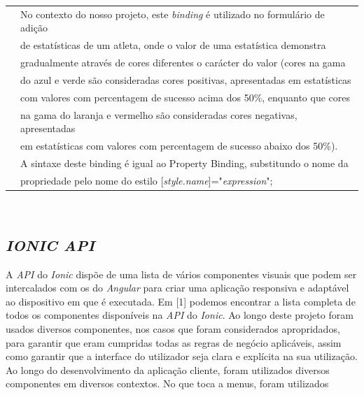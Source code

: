 \begin{tabular}{ll}
	& No contexto do nosso projeto, este \textit{binding} é utilizado no formulário de adição\\
	&de estatísticas de um atleta, onde o valor de uma estatística demonstra \\
	&gradualmente através de cores diferentes o carácter do valor (cores na gama \\
	&do azul e verde são consideradas cores positivas, apresentadas em estatísticas \\
	&com valores com percentagem de sucesso acima dos 50\%, enquanto que cores \\
	&na gama do laranja e vermelho são consideradas cores negativas, apresentadas\\
	& em estatísticas com valores com percentagem de sucesso abaixo dos 50\%). \\
	&A sintaxe deste binding é igual ao Property Binding, substitundo o nome da \\
	&propriedade pelo nome do estilo [\textit{style.name}]="\textit{expression}";\\
\end{tabular}
\\

\subsection{\textit{IONIC API}}\label{subsec414}

A \textit{API} do \textit{Ionic} dispõe de uma lista de vários componentes visuais que podem ser intercalados com os do \textit{Angular} para criar uma aplicação responsiva e adaptável ao dispositivo em que é executada. Em [1] podemos encontrar a lista completa de todos os componentes disponíveis na \textit{API} do \textit{Ionic}. Ao longo deste projeto foram usados diversos componentes, nos casos que foram considerados apropridados, para garantir que eram cumpridas todas as regras de negócio aplicáveis, assim como garantir que a interface do utilizador seja clara e explícita na sua utilização.
Ao longo do desenvolvimento da aplicação cliente, foram utilizados diversos componentes em diversos contextos. No que toca a menus, foram utilizados\\

